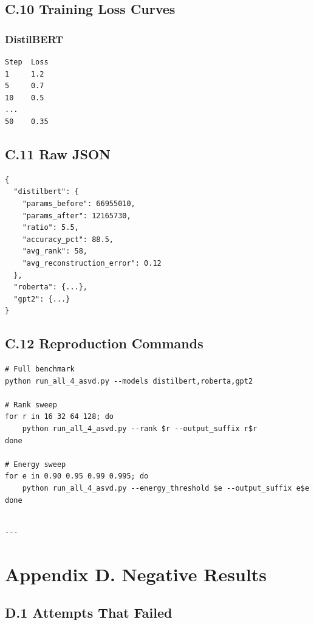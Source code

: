 \subsection{C.10 Training Loss Curves}

\subsubsection{DistilBERT}
\begin{lstlisting}
Step  Loss
1     1.2
5     0.7
10    0.5
...
50    0.35
\end{lstlisting}

\subsection{C.11 Raw JSON}

\begin{lstlisting}
{
  "distilbert": {
    "params_before": 66955010,
    "params_after": 12165730,
    "ratio": 5.5,
    "accuracy_pct": 88.5,
    "avg_rank": 58,
    "avg_reconstruction_error": 0.12
  },
  "roberta": {...},
  "gpt2": {...}
}
\end{lstlisting}

\subsection{C.12 Reproduction Commands}

\begin{lstlisting}
# Full benchmark
python run_all_4_asvd.py --models distilbert,roberta,gpt2

# Rank sweep
for r in 16 32 64 128; do
    python run_all_4_asvd.py --rank $r --output_suffix r$r
done

# Energy sweep
for e in 0.90 0.95 0.99 0.995; do
    python run_all_4_asvd.py --energy_threshold $e --output_suffix e$e
done
\end{lstlisting}
\begin{lstlisting}

---
\end{lstlisting}


\section{Appendix D. Negative Results}

\subsection{D.1 Attempts That Failed}

